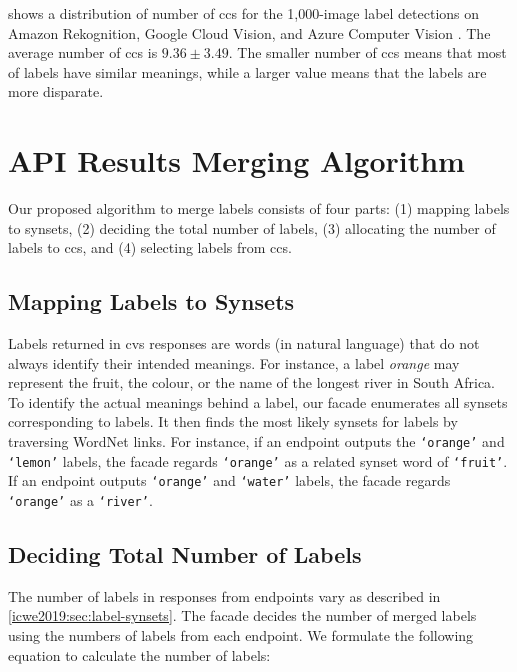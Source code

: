  shows a distribution of number of \glspl{cc} for the 1,000-image label detections on Amazon Rekognition, Google Cloud Vision, and Azure Computer Vision .
The average number of \glspl{cc} is $9.36 \pm 3.49$.
The smaller number of \glspl{cc} means that most of labels have similar meanings, while a larger value means that the labels are more disparate.

\section{API Results Merging Algorithm}\label{icwe2019:sec:algorithm}

Our proposed algorithm to merge labels consists of four parts: (1) mapping labels to synsets, (2) deciding the total number of labels, (3) allocating the number of labels to \glspl{cc}, and (4) selecting labels from \glspl{cc}.

\subsection{Mapping Labels to Synsets}\label{icwe2019:sec:label-to-synset}

Labels returned in \gls{cvs} responses are words (in natural language) that do not always identify their intended meanings.
For instance, a label \textit{orange} may represent the fruit, the colour, or the name of the longest river in South Africa.
To identify the actual meanings behind a label, our facade enumerates all synsets corresponding to labels.
It then finds the most likely synsets for labels by traversing WordNet links.
For instance, if an  endpoint outputs the \texttt{`orange'} and \texttt{`lemon'} labels, the facade regards \texttt{`orange'} as a related synset word of \texttt{`fruit'}.
If an  endpoint outputs \texttt{`orange'} and \texttt{`water'} labels, the facade regards \texttt{`orange'} as a \texttt{`river'}.

\subsection{Deciding Total Number of Labels}\label{icwe2019:sec:allocation-total}

The number of labels in responses from endpoints vary as described in \cref{icwe2019:sec:label-synsets}.
The facade decides the number of merged labels using the numbers of labels from each endpoint.
We formulate the following equation to calculate the number of labels:

